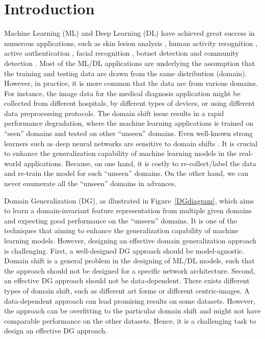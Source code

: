 \documentclass[twocolumn,preprint]{elsarticle}
\begin{document}
\section{Introduction} \label{sec:introduction}
Machine Learning (ML) and Deep Learning (DL) have achieved great success in numerous applications, such as skin lesion analysis \cite{perez2019solo, di2020saia}, human activity recognition \cite{tao2014ensemble, zhuang2020utility}, active authentication \cite{wu2016cost}, facial recognition \cite{ding2017trunk, nguyen2019autogan, zhuang2017fripal}, botnet detection \cite{mai2018cluster, zhuang2017peerhunter, zhuang2018enhanced} and community detection \cite{tagarelli2017ensemble, zhuang2019dynamo}. 
Most of the ML/DL applications are underlying the assumption that the training and testing data are drawn from the same distribution (domain). However, in practice, it is more common that the data are from various domains. For instance, the image data for the medical diagnosis application might be collected from different hospitals, by different types of devices, or using different data preprocessing protocols. The domain shift issue results in a rapid performance degradation, where the machine learning applications is trained on ``seen'' domains and tested on other ``unseen'' domains. Even well-known strong learners such as deep neural networks are sensitive to domain shifts \cite{dann}.  It is crucial to enhance the generalization capability of machine learning models in the real-world applications. Because, on one hand, it is costly to re-collect/label the data and re-train the model for such ``unseen'' domains.  On the other hand, we can never enumerate all the ``unseen'' domains in advances. 

Domain Generalization (DG), as illustrated in Figure~\ref{DGdiagram}, which aims to learn a domain-invariant feature representation from multiple given domains and expecting good performance on the “unseen” domains.
It is one of the techniques that aiming to enhance the generalization capability of machine learning models. 
However, designing an effective domain generalization approach is challenging.
First, a well-designed DG approach should be model-agnostic. Domain shift is a general problem in the designing of ML/DL models, such that the approach should not be designed for a specific network architecture.
Second, an effective DG approach should not be data-dependent. There exists different types of domain shift, such as different art forms or different centric-images. A data-dependent approach can lead promising results on some datasets. However, the approach can be overfitting to the particular domain shift and might not have comparable  performance on the other datasets.
Hence, it is a challenging task to design an effective DG approach.
\end{document}
